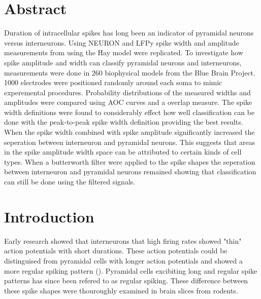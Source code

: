 \documentclass[altfont, fleqn]{uiophd}
\begin{document}
\chapter*{Abstract}
\noindent

Duration of intracellular spikes has long been an indicator 
of pyramidal neurons versus interneurons. 
Using NEURON and LFPy spike width and amplitude measurements from
\Textcite{pettersen_amplitude_2008}
using the Hay model
were replicated.
To investigate how spike amplitude
and width can classify pyramidal neurons and interneurons,
measurements were done 
in 260 biophysical models
from the Blue Brain Project. 
1000 electrodes were positioned randomly around each soma to mimic
experemental procedures.
Probability distributions of the measured widths and amplitudes
were compared using AOC curves and a overlap measure. 
The spike width definitions were found to considerably effect
how well classification can be done with 
the peak-to-peak spike width definition providing the best results. 
When the spike width combined with spike amplitude 
significantly increased 
the seperation between
interneuron and pyramidal neurons.
This suggests that areas in the spike amplitude width space 
can be attributed to certain kinds of cell types. 
When a butterworth filter were applied to the spike shapes
the seperation between interneuron and pyramidal neurons remained
showing that classification can still be done using the filtered 
signals. 

\setcounter{tocdepth}{1}
\startcontents
\tableofcontents
\chapter{Introduction}


Early research showed that interneurons that high firing rates
showed "thin" action potentials with short durations. 
These action potentials could be distinguised from pyramidal 
cells with longer action potentials and showed a 
more regular spiking pattern
(\textcite{mountcastle_cortical_1969}).
Pyramidal cells excibiting long and regular spike patterns
has since been refered to as regular spiking. 
These difference between these spike shapes were 
thouroughly examined in brain slices from rodents. 
\end{document}
